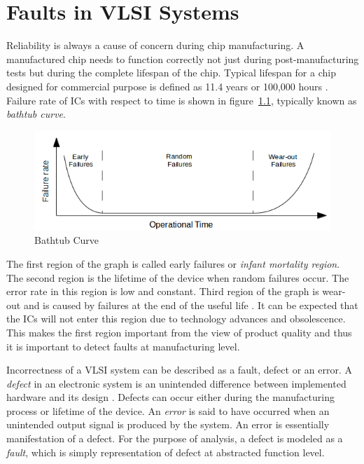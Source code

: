 \chapter{Faults in VLSI Systems}
\label{chap:chapter2}

Reliability is always a cause of concern during chip manufacturing. A manufactured chip needs to function correctly not just during post-manufacturing tests but during the complete lifespan of the chip. Typical lifespan for a chip designed for commercial purpose is defined as 11.4 years or 100,000 hours \cite{kishore2009}. Failure rate of ICs with respect to time is shown in figure~\ref{fig:bathtubcurve}, typically known as \emph{bathtub curve}.

\begin{figure}[h]
  \begin{center}
    \captionsetup{justification=centering}
    \includegraphics[scale=0.5]{figures/bathtubcurve.png}
    \caption{Bathtub Curve}
    \label{fig:bathtubcurve}
  \end{center}
\end{figure}

The first region of the graph is called early failures or \emph{infant mortality region}. The second region is the lifetime of the device when random failures occur. The error rate in this region is low and constant. Third region of the graph is wear-out and is caused by failures at the end of the useful life \cite{kishore2009}. It can be expected that the ICs will not enter this region due to technology advances and obsolescence. This makes the first region important from the view of product quality and thus it is important to detect faults at manufacturing level. 

Incorrectness of a VLSI system can be described as a fault, defect or an error. A \emph{defect} in an electronic system is an unintended difference between implemented hardware and its design \cite{Agrawal2000}. Defects can occur either during the manufacturing process or lifetime of the device. An \emph{error} is said to have occurred when an unintended output signal is produced by the system. An error is essentially manifestation of a defect. For the purpose of analysis, a defect is modeled as a \emph{fault}, which is simply representation of defect at abstracted function level.

